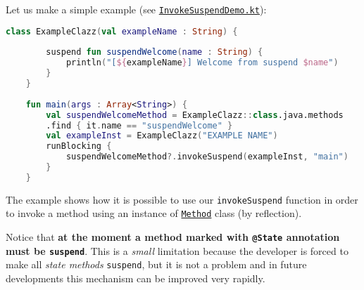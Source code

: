 Let us make a simple example (see \href{https://github.com/LM-96/QA-Extensions/blob/main/it.unibo.qakactor/src/main/kotlin/demo/InvokeSuspendDemo.kt}{\texttt{InvokeSuspendDemo.kt}}):
\begin{lstlisting}[caption=Example for \texttt{invokeSuspend}, language=Kotlin]
	class ExampleClazz(val exampleName : String) {
		
		suspend fun suspendWelcome(name : String) {
			println("[${exampleName}] Welcome from suspend $name")
		}
	}
	
	fun main(args : Array<String>) {
		val suspendWelcomeMethod = ExampleClazz::class.java.methods
		.find { it.name == "suspendWelcome" }
		val exampleInst = ExampleClazz("EXAMPLE NAME")
		runBlocking {
			suspendWelcomeMethod?.invokeSuspend(exampleInst, "main")
		}
	}
\end{lstlisting}
The example shows how it is possible to use our \texttt{invokeSuspend} function in order to invoke a method using an instance of \href{https://docs.oracle.com/javase/8/docs/api/java/lang/reflect/Method.html}{\texttt{Method}} class (by reflection). 

Notice that \textcolor{BrickRed}{\textbf{at the moment a method marked with \texttt{@State} annotation must be \texttt{suspend}}}. This is a \textit{small} limitation because the developer is forced to make all \textit{state methods} \texttt{suspend}, but it is not a problem and in future developments this mechanism can be improved very rapidly.